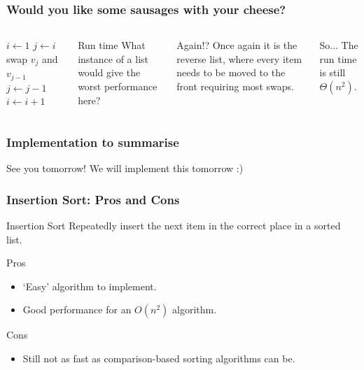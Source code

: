 \begin{frame}
	\frametitle{Would you like some sausages with your cheese?}
	\begin{columns}
		\begin{algorithmic}
			\State $i \gets 1$ 
			\State $j \gets i$
			\State swap $v_j$ and $v_{j-1}$	
			\State $j \gets j -1$
			\EndWhile
			\State $i \gets i+1$
			\EndWhile
		\end{algorithmic}
		\begin{questionblock}{Run time}
			What instance of a list would give the worst performance here?	
		\end{questionblock}
		\pause
		\begin{answerblock}{Again!?}
			Once again it is the reverse list, where every item needs to be moved to the front requiring most swaps.
		\end{answerblock}
		\pause
			\begin{block}{So...}
				The run time is still $\Theta(n^2)$.
			\end{block}	
	\end{columns}

	
\end{frame}

\begin{frame}
	\frametitle{Implementation to summarise}
	
		\begin{alertblock}{See you tomorrow!}
			We will implement this tomorrow :)
		\end{alertblock}	
\end{frame}

\begin{frame}
	\frametitle{Insertion Sort: Pros and Cons}
		\begin{block}{Insertion Sort}
			Repeatedly insert the next item in the correct place in a sorted list.
		\end{block}	
		\begin{exampleblock}{Pros}
			\begin{itemize}
				\item `Easy' algorithm to implement.
				\item Good performance for an $O(n^2)$ algorithm.
			\end{itemize}
		\end{exampleblock}	
		\begin{alertblock}{Cons}
			\begin{itemize}
				\item Still not as fast as comparison-based sorting algorithms can be.
			\end{itemize}
		\end{alertblock}	
	
\end{frame}
